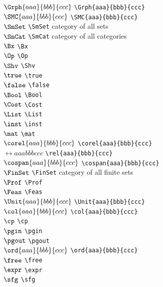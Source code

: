 \documentclass[11pt, book]{memoir}
\begin{document}
\begin{multicols}{2}
$\Grph{aaa}{bbb}{ccc}$ \verb|\Grph{aaa}{bbb}{ccc}| \\
$\SMC{aaa}{bbb}{ccc}$ \verb|\SMC{aaa}{bbb}{ccc}| \\
$\SmSet$ \verb|\SmSet| category of all sets \\
$\SmCat$ \verb|\SmCat| category of all categories \\
$\Bx$ \verb|\Bx| \\
$\Op$ \verb|\Op| \\
$\Shv$ \verb|\Shv| \\
$\true$ \verb|\true| \\
$\false$ \verb|\false| \\
$\Bool$ \verb|\Bool| \\
$\Cost$ \verb|\Cost| \\
$\List$ \verb|\List| \\
$\inst$ \verb|\inst| \\
$\mat$ \verb|\mat| \\
$\corel{aaa}{bbb}{ccc}$ \verb|\corel{aaa}{bbb}{ccc}| \\
$\rel{aaa}{bbb}{ccc}$ \verb|\rel{aaa}{bbb}{ccc}| \\
$\cospan{aaa}{bbb}{ccc}$ \verb|\cospan{aaa}{bbb}{ccc}| \\
$\FinSet$ \verb|\FinSet| category of all finite sets \\
$\Prof$ \verb|\Prof| \\
$\Feas$ \verb|\Feas| \\
$\Unit{aaa}{bbb}{ccc}$ \verb|\Unit{aaa}{bbb}{ccc}| \\
$\col{aaa}{bbb}{ccc}$ \verb|\col{aaa}{bbb}{ccc}| \\
$\cp$ \verb|\cp| \\
$\pgin$ \verb|\pgin| \\
$\pgout$ \verb|\pgout| \\
$\ord{aaa}{bbb}{ccc}$ \verb|\ord{aaa}{bbb}{ccc}| \\
$\free$ \verb|\free| \\
$\expr$ \verb|\expr| \\
$\sfg$ \verb|\sfg| \\

\end{multicols}
\end{document}

